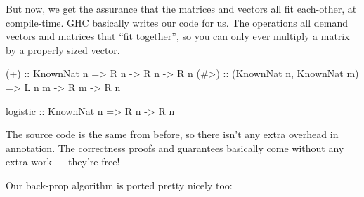 \documentclass[]{article}
\newenvironment{Shaded}{}{}
\newcommand{\DataTypeTok}[1]{\textcolor[rgb]{0.56,0.13,0.00}{{#1}}}
\newcommand{\OtherTok}[1]{\textcolor[rgb]{0.00,0.44,0.13}{{#1}}}
\newcommand{\NormalTok}[1]{{#1}}
\begin{document}
But now, we get the assurance that the matrices and vectors all fit each-other,
at compile-time. GHC basically writes our code for us. The operations all demand
vectors and matrices that ``fit together'', so you can only ever multiply a
matrix by a properly sized vector.

\begin{Shaded}
\begin{Highlighting}[]
\OtherTok{(+)  ::} \DataTypeTok{KnownNat} \NormalTok{n}
     \OtherTok{=>} \DataTypeTok{R} \NormalTok{n }\OtherTok{->} \DataTypeTok{R} \NormalTok{n }\OtherTok{->} \DataTypeTok{R} \NormalTok{n}
\OtherTok{(#>) ::} \NormalTok{(}\DataTypeTok{KnownNat} \NormalTok{n, }\DataTypeTok{KnownNat} \NormalTok{m)}
     \OtherTok{=>} \DataTypeTok{L} \NormalTok{n m }\OtherTok{->} \DataTypeTok{R} \NormalTok{m }\OtherTok{->} \DataTypeTok{R} \NormalTok{n}

\OtherTok{logistic ::} \DataTypeTok{KnownNat} \NormalTok{n}
         \OtherTok{=>} \DataTypeTok{R} \NormalTok{n }\OtherTok{->} \DataTypeTok{R} \NormalTok{n}
\end{Highlighting}
\end{Shaded}

The source code is the same from before, so there isn't any extra overhead in
annotation. The correctness proofs and guarantees basically come without any
extra work --- they're free!

Our back-prop algorithm is ported pretty nicely too:
\end{document}
